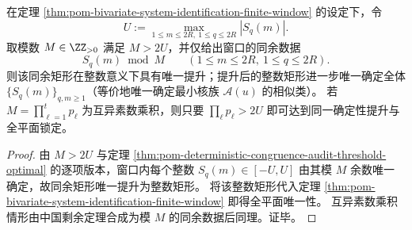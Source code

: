 \begin{corollary}\label{cor:pom-bivariate-mod-rectangle-lifts-to-plane}
在定理 \ref{thm:pom-bivariate-system-identification-finite-window} 的设定下，令
\[
U:=\max_{1\le m\le 2R,\ 1\le q\le 2R}|S_q(m)|.
\]
取模数 \(M\in\ZZ_{>0}\) 满足 \(M>2U\)，并仅给出窗口的同余数据
\[
S_q(m)\bmod M\qquad(1\le m\le 2R,\ 1\le q\le 2R).
\]
则该同余矩形在整数意义下具有唯一提升；提升后的整数矩形进一步唯一确定全体 \(\{S_q(m)\}_{q,m\ge 1}\)（等价地唯一确定最小核族 \(\mathcal A(u)\) 的相似类）。
若 \(M=\prod_{\ell=1}^{t}p_\ell\) 为互异素数乘积，则只要 \(\prod_{\ell}p_\ell>2U\) 即可达到同一确定性提升与全平面锁定。
\end{corollary}
\begin{proof}
由 \(M>2U\) 与定理 \ref{thm:pom-deterministic-congruence-audit-threshold-optimal} 的逐项版本，窗口内每个整数 \(S_q(m)\in[-U,U]\) 由其模 \(M\) 余数唯一确定，故同余矩形唯一提升为整数矩形。
将该整数矩形代入定理 \ref{thm:pom-bivariate-system-identification-finite-window} 即得全平面唯一性。
互异素数乘积情形由中国剩余定理合成为模 \(M\) 的同余数据后同理。证毕。
\end{proof}
